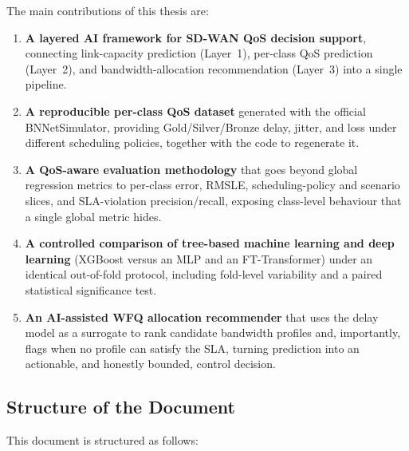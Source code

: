 \documentclass[a4paper,12pt]{Classes/RoboticsLaTeX}
\begin{document}
    The main contributions of this thesis are:
    \begin{enumerate}
        \item \textbf{A layered AI framework for SD-WAN QoS decision support}, connecting link-capacity prediction (Layer~1), per-class QoS prediction (Layer~2), and bandwidth-allocation recommendation (Layer~3) into a single pipeline.
        \item \textbf{A reproducible per-class QoS dataset} generated with the official BNNetSimulator, providing Gold/Silver/Bronze delay, jitter, and loss under different scheduling policies, together with the code to regenerate it.
        \item \textbf{A QoS-aware evaluation methodology} that goes beyond global regression metrics to per-class error, RMSLE, scheduling-policy and scenario slices, and SLA-violation precision/recall, exposing class-level behaviour that a single global metric hides.
        \item \textbf{A controlled comparison of tree-based machine learning and deep learning} (XGBoost versus an MLP and an FT-Transformer) under an identical out-of-fold protocol, including fold-level variability and a paired statistical significance test.
        \item \textbf{An AI-assisted WFQ allocation recommender} that uses the delay model as a surrogate to rank candidate bandwidth profiles and, importantly, flags when no profile can satisfy the SLA, turning prediction into an actionable, and honestly bounded, control decision.
    \end{enumerate}

    \subsection*{Structure of the Document}
    
    This document is structured as follows:
    
\end{document}
